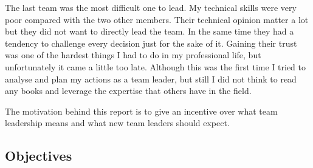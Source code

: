 The last team was the most difficult one to lead. My technical skills were very poor compared with the two other members. Their technical opinion matter a lot but they did not want to directly lead the team. In the same time they had a tendency to challenge every decision just for the sake of it. Gaining their trust was one of the hardest things I had to do in my professional life, but unfortunately it came a little too late. Although this was the first time I tried to analyse and plan my actions as a team leader, but still I did not think to read any books and leverage the expertise that others have in the field.

The motivation behind this report is to give an incentive over what team leadership means and what new team leaders should expect.

\subsection{Objectives}
\label{sub-sec:objectives}



